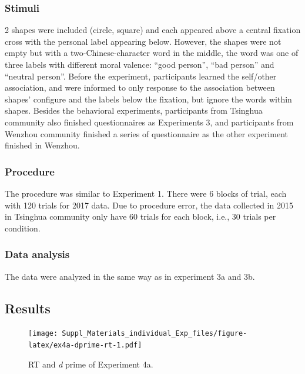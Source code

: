 \documentclass[
  english,
  man]{apa6}
\begin{document}
\hypertarget{stimuli-1}{%
\subsubsection{Stimuli}\label{stimuli-1}}

2 shapes were included (circle, square) and each appeared above a central fixation cross with the personal label appearing below. However, the shapes were not empty but with a two-Chinese-character word in the middle, the word was one of three labels with different moral valence: \enquote{good person}, \enquote{bad person} and \enquote{neutral person}. Before the experiment, participants learned the self/other association, and were informed to only response to the association between shapes' configure and the labels below the fixation, but ignore the words within shapes. Besides the behavioral experiments, participants from Tsinghua community also finished questionnaires as Experiments 3, and participants from Wenzhou community finished a series of questionnaire as the other experiment finished in Wenzhou.

\hypertarget{procedure-6}{%
\subsubsection{Procedure}\label{procedure-6}}

The procedure was similar to Experiment 1. There were 6 blocks of trial, each with 120 trials for 2017 data. Due to procedure error, the data collected in 2015 in Tsinghua community only have 60 trials for each block, i.e., 30 trials per condition.

\hypertarget{data-analysis-5}{%
\subsubsection{Data analysis}\label{data-analysis-5}}

The data were analyzed in the same way as in experiment 3a and 3b.

\hypertarget{results-6}{%
\subsection{Results}\label{results-6}}

\begin{figure}
\centering
\texttt{[image: Suppl\_Materials\_individual\_Exp\_files/figure-latex/ex4a-dprime-rt-1.pdf]}
\caption{\label{fig:ex4a-dprime-rt}RT and \emph{d} prime of Experiment 4a.}
\end{figure}
\end{document}
